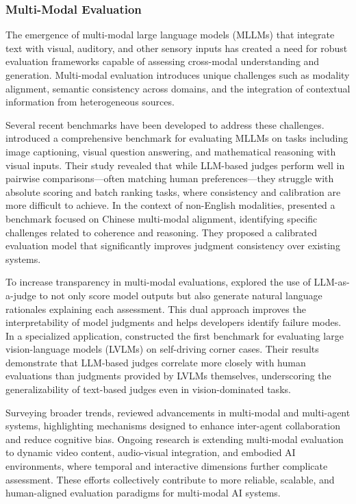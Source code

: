 \documentclass[acmsmall,screen]{acmart}
\begin{document}
\subsubsection{\textbf{Multi-Modal Evaluation}}
The emergence of multi-modal large language models (MLLMs) that integrate text with visual, auditory, and other sensory inputs has created a need for robust evaluation frameworks capable of assessing cross-modal understanding and generation. Multi-modal evaluation introduces unique challenges such as modality alignment, semantic consistency across domains, and the integration of contextual information from heterogeneous sources.

Several recent benchmarks have been developed to address these challenges. \citet{mllm-as-a-judge} introduced a comprehensive benchmark for evaluating MLLMs on tasks including image captioning, visual question answering, and mathematical reasoning with visual inputs. Their study revealed that while LLM-based judges perform well in pairwise comparisons—often matching human preferences—they struggle with absolute scoring and batch ranking tasks, where consistency and calibration are more difficult to achieve. In the context of non-English modalities, \citet{wu2024alignmmbench} presented a benchmark focused on Chinese multi-modal alignment, identifying specific challenges related to coherence and reasoning. They proposed a calibrated evaluation model that significantly improves judgment consistency over existing systems.

To increase transparency in multi-modal evaluations, \citet{xiong2024llava} explored the use of LLM-as-a-judge to not only score model outputs but also generate natural language rationales explaining each assessment. This dual approach improves the interpretability of model judgments and helps developers identify failure modes. In a specialized application, \citet{chen2024automated} constructed the first benchmark for evaluating large vision-language models (LVLMs) on self-driving corner cases. Their results demonstrate that LLM-based judges correlate more closely with human evaluations than judgments provided by LVLMs themselves, underscoring the generalizability of text-based judges even in vision-dominated tasks.

Surveying broader trends, \citet{jiang2024multi} reviewed advancements in multi-modal and multi-agent systems, highlighting mechanisms designed to enhance inter-agent collaboration and reduce cognitive bias. Ongoing research is extending multi-modal evaluation to dynamic video content, audio-visual integration, and embodied AI environments, where temporal and interactive dimensions further complicate assessment. These efforts collectively contribute to more reliable, scalable, and human-aligned evaluation paradigms for multi-modal AI systems.
\end{document}
